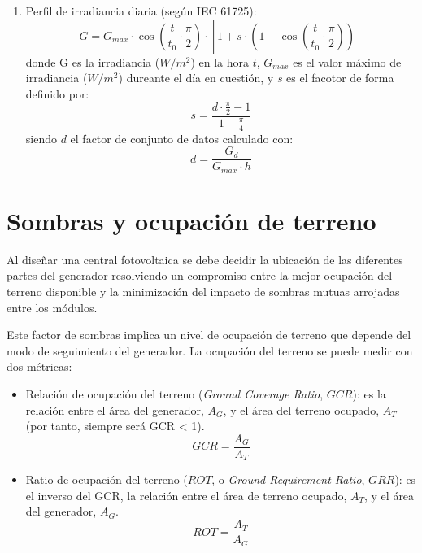 \begin{enumerate}
\item Perfil de irradiancia diaria (según IEC 61725):
\begin{equation}
G = G_{max} \cdot \cos\left(\frac{t}{t_0} \cdot \frac{\pi}{2}\right) \cdot \left[1 + s \cdot \left(1 - \cos\left(\frac{t}{t_0} \cdot \frac{\pi}{2}\right)\right)\right]
\end{equation}
donde G es la irradiancia (\(W/m^2\)) en la hora \(t\), \(G_{max}\) es el valor máximo de irradiancia (\(W/m^2\)) dureante el día en cuestión, y \(s\) es el facotor de forma definido por:
\begin{equation}
s = \frac{d \cdot \frac{\pi}{2} - 1}{1 - \frac{\pi}{4}}
\end{equation}
siendo \(d\) el factor de conjunto de datos calculado con:
\begin{equation}
d = \frac{G_d}{G_{max} \cdot h}
\end{equation}
\end{enumerate}

\section{Sombras y ocupación de terreno}
\label{sec:orga1df3bd}
Al diseñar una central fotovoltaica se debe decidir la ubicación de las diferentes partes del generador resolviendo un compromiso entre la mejor ocupación del terreno disponible y la minimización del impacto de sombras mutuas arrojadas entre los módulos.

Este factor de sombras implica un nivel de ocupación de terreno que depende del modo de seguimiento del generador. La ocupación del terreno se puede medir con dos métricas:
\begin{itemize}
\item Relación de ocupación del terreno (\emph{Ground Coverage Ratio}, \(GCR\)): es la relación entre el área del generador, \(A_G\), y el área del terreno ocupado, \(A_T\) (por tanto, siempre será GCR < 1).  
\begin{equation}
GCR = \frac{A_G}{A_T}
\end{equation}
\item Ratio de ocupación del terreno (\(ROT\), o \emph{Ground Requirement Ratio}, \(GRR\)): es el inverso del GCR, la relación entre el área de terreno ocupado, \(A_T\), y el área del generador, \(A_G\). 
\begin{equation}
ROT = \frac{A_T}{A_G}
\end{equation}
\end{itemize}

